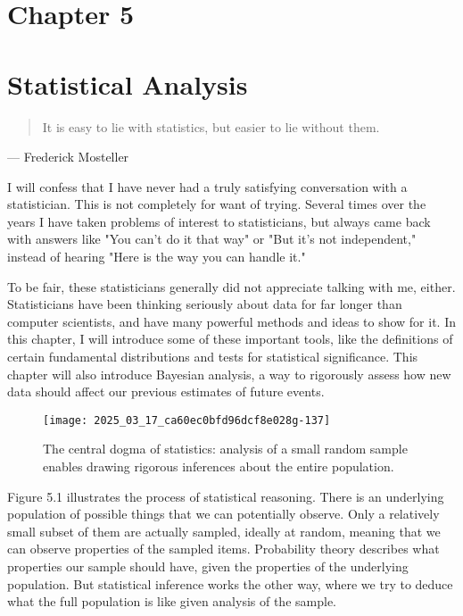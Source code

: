 \documentclass[10pt]{article}
\begin{document}
\section*{Chapter 5}
\section*{Statistical Analysis}
\begin{quote}
It is easy to lie with statistics, but easier to lie without them.
\end{quote}

\begin{flushright}
— Frederick Mosteller
\end{flushright}

I will confess that I have never had a truly satisfying conversation with a statistician. This is not completely for want of trying. Several times over the years I have taken problems of interest to statisticians, but always came back with answers like "You can't do it that way" or "But it's not independent," instead of hearing "Here is the way you can handle it."

To be fair, these statisticians generally did not appreciate talking with me, either. Statisticians have been thinking seriously about data for far longer than computer scientists, and have many powerful methods and ideas to show for it. In this chapter, I will introduce some of these important tools, like the definitions of certain fundamental distributions and tests for statistical significance. This chapter will also introduce Bayesian analysis, a way to rigorously assess how new data should affect our previous estimates of future events.\\

\begin{figure}[h]
\centering
\texttt{[image: 2025\_03\_17\_ca60ec0bfd96dcf8e028g-137]}
\caption{The central dogma of statistics: analysis of a small random sample enables drawing rigorous inferences about the entire population.}
\end{figure} 

Figure 5.1 illustrates the process of statistical reasoning. There is an underlying population of possible things that we can potentially observe. Only a relatively small subset of them are actually sampled, ideally at random, meaning that we can observe properties of the sampled items. Probability theory describes what properties our sample should have, given the properties of the underlying population. But statistical inference works the other way, where we try to deduce what the full population is like given analysis of the sample.
\end{document}
